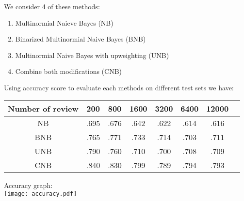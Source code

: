 \documentclass[]{article}
\begin{document}
We consider 4 of these methods:
\begin{enumerate}
	\item Multinormial Naieve Bayes (NB)
	\item Binarized Multinormial Naive Bayes (BNB)
	\item Multinormial Naive Bayes with upweighting (UNB)
	\item Combine both modifications (CNB)
\end{enumerate}
Using accuracy score to evaluate each methods on different test sets we have:
\begin{center}
	\begin{tabular}{c|ccccccc}
	Number of review		& 200 & 800 & 1600 & 3200 & 6400 & 12000\\ \hline
	NB      &  .695  & .676  & .642  & .622 	&   .614 & .616\\
	BNB     &  .765  & .771  & .733  & .714 	&	.703 & .711\\ 
	UNB     &  .790   & .760 & .710  & .700 	&  	.708 & .709\\ 
	CNB     &  .840   & .830 & .799  & .789 	&	.794 & .793\\ 
	\end{tabular}
\end{center}
Accuracy graph:\\
\texttt{[image: accuracy.pdf]}
\end{document}
